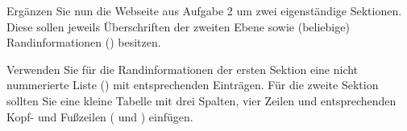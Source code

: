 %
\par Ergänzen Sie nun die Webseite aus Aufgabe 2 um zwei eigenständige
Sektionen. Diese sollen jeweils Überschriften der zweiten Ebene sowie
(beliebige) Randinformationen () besitzen.
%
\par Verwenden Sie für die Randinformationen der ersten Sektion eine nicht
nummerierte Liste () mit entsprechenden Einträgen. Für die zweite
Sektion sollten Sie eine kleine Tabelle mit drei Spalten, vier Zeilen und
entsprechenden Kopf- und Fußzeilen ( und ) einfügen.